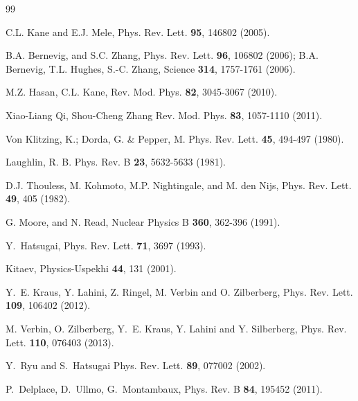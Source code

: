 \documentclass[pra,aps,twocolumn,showpacs]{revtex4}
\begin{document}
\begin{thebibliography}{99}

C.L. Kane and E.J. Mele, 
Phys. Rev. Lett. \textbf{95}, 146802 (2005).

B.A. Bernevig, and S.C. Zhang, 
Phys. Rev. Lett. \textbf{96}, 106802 (2006);
B.A. Bernevig, T.L. Hughes, S.-C. Zhang, 
Science \textbf{314}, 1757-1761 (2006).

 M.Z. Hasan, C.L. Kane, 
Rev. Mod. Phys. \textbf{82}, 3045-3067 (2010).

 Xiao-Liang Qi, Shou-Cheng Zhang
Rev. Mod. Phys. \textbf{83}, 1057-1110 (2011).

Von Klitzing, K.; Dorda, G. \& Pepper, M.
Phys. Rev. Lett. {\bf 45}, 494-497 (1980).

Laughlin, R. B. 
Phys. Rev. B \textbf{23}, 5632-5633 (1981).

 D.J. Thouless, M. Kohmoto, M.P. Nightingale, and M. den Nijs,
Phys. Rev. Lett. {\bf 49}, 405 (1982).

G. Moore, and N. Read, 
Nuclear Physics B \textbf{360}, 362-396 (1991).

 Y.~Hatsugai,
Phys. Rev. Lett. \textbf{71}, 3697 (1993).

 Kitaev,
Physics-Uspekhi {\bf 44}, 131 (2001).

 Y.~E. Kraus, Y. Lahini, Z. Ringel, M. Verbin and O. Zilberberg,
Phys. Rev. Lett. {\bf 109}, 106402 (2012).

 M. Verbin, O. Zilberberg, Y.~E. Kraus, Y. Lahini and Y. Silberberg,
Phys. Rev. Lett. {\bf 110},  076403 (2013).

 Y.~Ryu and S.~Hatsugai
  Phys. Rev. Lett. \textbf{89}, 077002 (2002).
    
 P.~Delplace, D.~Ullmo, G.~Montambaux,
  Phys. Rev. B \textbf{84},
  195452 (2011).


\end{thebibliography}
\end{document}
